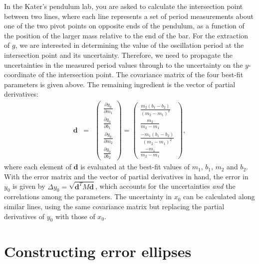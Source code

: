 \documentclass{article}
\begin{document}
In the Kater's pendulum lab, you are asked to calculate the intersection point between two lines, where each line represents a set of period measurements about one of the two pivot points on opposite ends of the pendulum, as a function of the position of the larger mass relative to the end of the bar. For the extraction of $g$, we are interested in determining the value of the oscillation period at the intersection point and its uncertainty. Therefore, we need to propagate the uncertainties in the measured period values through to the uncertainty on the $y$-coordinate of the intersection point. The covariance matrix of the four best-fit parameters is given above. The remaining ingredient is the vector of partial derivatives:
\begin{eqnarray}
  \mathbf{d} &=& \left(\begin{array}{c} \frac{\partial y_0}{\partial m_1} \\ \frac{\partial y_0}{\partial b_1} \\ \frac{\partial y_0}{\partial m_2} \\ \frac{\partial y_0}{\partial b_2} \end{array}\right) = \left(\begin{array}{c} \frac{m_2(b_1-b_2)}{(m_2-m_1)^2} \\ \frac{m_2}{m_2-m_1} \\ \frac{-m_1(b_1-b_2)}{(m_2-m_1)^2} \\ \frac{-m_1}{m_2-m_1}\end{array}\right),
\end{eqnarray}
where each element of $\mathbf{d}$ is evaluated at the best-fit values of $m_1$, $b_1$, $m_2$ and $b_2$. With the error matrix and the vector of partial derivatives in hand, the error in $y_0$ is given by $\Delta y_0 = \sqrt{\mathbf{d}^{T} M \mathbf{d}}$, which accounts for the uncertainties \emph{and} the correlations among the parameters. The uncertainty in $x_0$ can be calculated along similar lines, using the same covariance matrix but replacing the partial derivatives of $y_0$ with those of $x_0$. 

\section{Constructing error ellipses}
\end{document}
